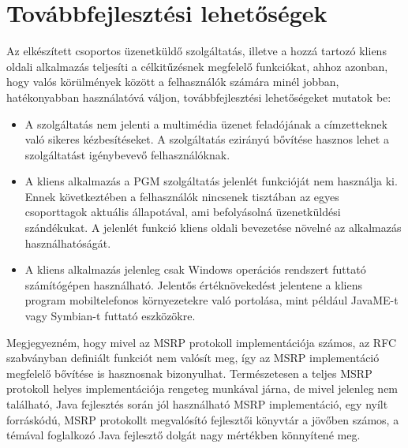 

\section{Továbbfejlesztési lehetőségek}
\label{sec:tovabbfejlesztes}

Az elkészített csoportos üzenetküldő szolgáltatás, illetve a hozzá tartozó kliens oldali alkalmazás teljesíti a célkitűzésnek megfelelő funkciókat, ahhoz azonban, hogy valós körülmények között a felhasználók számára minél jobban, hatékonyabban használatóvá váljon, továbbfejlesztési lehetőségeket mutatok be:

\begin{itemize}\itemsep1pt
\item	A szolgáltatás nem jelenti a multimédia üzenet feladójának a címzetteknek való sikeres kézbesítéseket. A szolgáltatás ezirányú bővítése hasznos lehet a szolgáltatást igénybevevő felhasználóknak.
\item A kliens alkalmazás a PGM szolgáltatás jelenlét funkcióját nem használja ki. Ennek következtében a felhasználók nincsenek tisztában az egyes csoporttagok aktuális állapotával, ami befolyásolná üzenetküldési szándékukat. A jelenlét funkció kliens oldali bevezetése növelné az alkalmazás használhatóságát.
\item A kliens alkalmazás jelenleg csak Windows operációs rendszert futtató számítógépen használható. Jelentős értéknövekedést jelentene a kliens program mobiltelefonos környezetekre való portolása, mint például JavaME-t vagy Symbian-t futtató eszközökre.
\end{itemize} 

Megjegyezném, hogy mivel az MSRP protokoll implementációja számos, az RFC szabványban definiált funkciót nem valósít meg, így az MSRP implementáció megfelelő bővítése is hasznosnak bizonyulhat. Természetesen a teljes MSRP protokoll helyes implementációja rengeteg munkával járna, de mivel jelenleg nem található, Java fejlesztés során jól használható MSRP implementáció, egy nyílt forráskódú, MSRP protokollt megvalósító fejlesztői könyvtár a jövőben számos, a témával foglalkozó Java fejlesztő dolgát nagy mértékben könnyítené meg.
